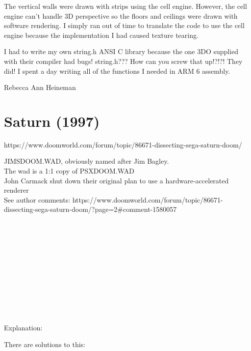{\par
The vertical walls were drawn with strips using the cell engine. However, the cell engine can't handle 3D perspective so the floors and ceilings were drawn with software rendering. I simply ran out of time to translate the code to use the cell engine because the implementation I had caused texture tearing.\\
\par
I had to write my own string.h ANSI C library because the one 3DO supplied with their compiler had bugs! string.h??? How can you screw that up!?!?! They did! I spent a day writing all of the functions I needed in ARM 6 assembly.}{Rebecca Ann Heineman}





\section{Saturn (1997)}
https://www.doomworld.com/forum/topic/86671-dissecting-sega-saturn-doom/\\
\par
JIMSDOOM.WAD, obviously named after Jim Bagley.\\
The wad is a 1:1 copy of PSXDOOM.WAD\\
John Carmack shut down their original plan to use a hardware-accelerated renderer\\
See author comments: https://www.doomworld.com/forum/topic/86671-dissecting-sega-saturn-doom/?page=2\#comment-1580057\\
\\
\\
\par
{}\\
\par
{}\\
\par
\begin{minipage}{\textwidth}
\\
\par

\\
\par

\\
\par
\end{minipage}
\par
Explanation:\\
\par
{}
There are solutions to this:\\
\par
{}




